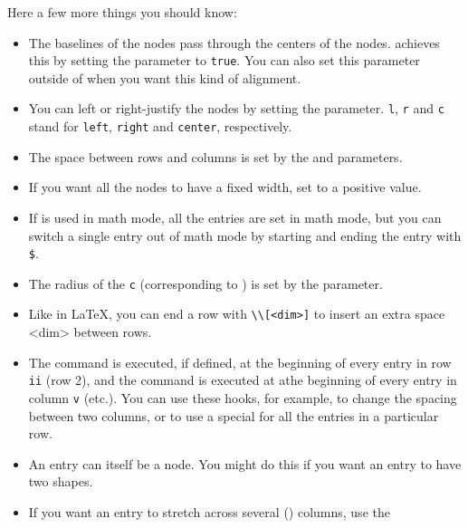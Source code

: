 \documentclass[fontsize=11pt,english,BCOR=10mm,DIV=12,bibliography=totoc,parskip=false,headings=small,
    headinclude=false,footinclude=false,oneside]{pst-doc}
\begin{document}
Here a few more things you should know:
\begin{itemize}
 \item The baselines of the nodes pass through the centers of the
 nodes.  achieves this by setting the
parameter to \verb|true|. You can also set this parameter outside of 
when you want this kind of alignment.

 \item You can left or right-justify the nodes by setting the
parameter. \verb|l|, \verb|r| and \verb|c| stand for \verb|left|, \verb|right| and \verb|center|,
respectively.

 \item The space between rows and columns is set by the
   and 
parameters.

 \item If you want all the nodes to have a fixed width, set
to a positive value.

 \item If  is used in math mode, all the entries are set in math
 mode, but you can switch a single entry out of math mode by starting and
 ending the entry with \verb|$|. %

 \item The radius of the \verb|c|  (corresponding to ) is set by
the  parameter.

 \item Like in \LaTeX, you can end a row with \verb|\\[<dim>]| to insert an extra
 space <dim> between rows.

 \item The command  is executed, if defined, at the beginning of
 every entry in row \verb|ii| (row 2), and the command  is executed at
 athe beginning of every entry in column \verb|v| (etc.). You can use these hooks,
 for example, to change the spacing between two columns, or to use a special
  for all the entries in a particular row.

 \item An entry can itself be a node. You might do this if you want an entry
 to have two shapes.

 \item If you want an entry to stretch across several () columns, use the


\end{itemize}
\end{document}
